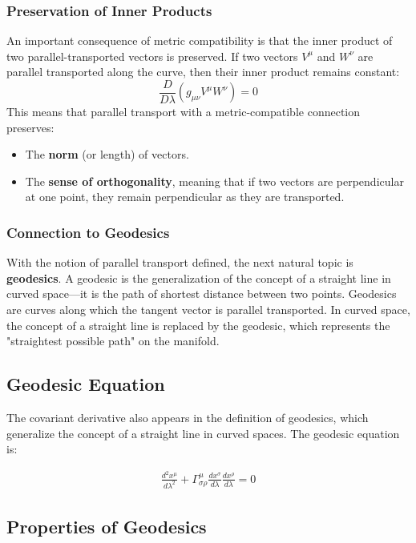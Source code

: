 \documentclass[12pt]{book}
\begin{document}
\subsubsection{Preservation of Inner Products}
An important consequence of metric compatibility is that the inner product of two parallel-transported vectors is preserved. If two vectors \( V^\mu \) and \( W^\nu \) are parallel transported along the curve, then their inner product remains constant:
\[
\frac{D}{D\lambda} (g_{\mu\nu} V^\mu W^\nu) = 0
\]
This means that parallel transport with a metric-compatible connection preserves:
\begin{itemize}
    \item The \textbf{norm} (or length) of vectors.
    \item The \textbf{sense of orthogonality}, meaning that if two vectors are perpendicular at one point, they remain perpendicular as they are transported.
\end{itemize}

\subsubsection{Connection to Geodesics}
With the notion of parallel transport defined, the next natural topic is \textbf{geodesics}. A geodesic is the generalization of the concept of a straight line in curved space—it is the path of shortest distance between two points. Geodesics are curves along which the tangent vector is parallel transported. In curved space, the concept of a straight line is replaced by the geodesic, which represents the "straightest possible path" on the manifold.



\subsection{Geodesic Equation}
The covariant derivative also appears in the definition of geodesics, which generalize the concept of a straight line in curved spaces. The geodesic equation is:

\begin{align}
\frac{d^2 x^\mu}{d\lambda^2} + \Gamma^\mu_{\sigma\rho} \frac{dx^\sigma}{d\lambda} \frac{dx^\rho}{d\lambda} = 0
\end{align}

\subsection{Properties of Geodesics}
\end{document}
